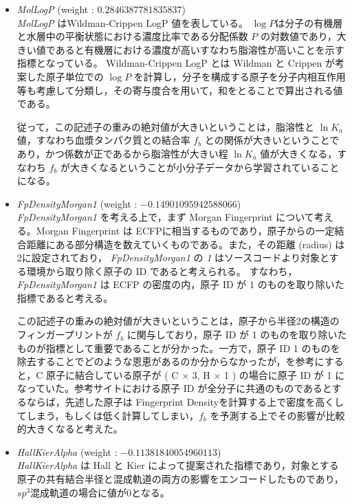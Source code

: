 \documentclass[a4j,11pt]{jarticle}
\begin{document}
\begin{itemize}
\item  \textit{MolLogP} (weight : $0.2846387781835837$) \\
 \textit{MolLogP} はWildman-Crippen LogP 値を表している。\cite{rdkit_mollogp} $\log{P}$は分子の有機層と水層中の平衡状態における濃度比率である分配係数 $P$ の対数値であり，大きい値であると有機層における濃度が高いすなわち脂溶性が高いことを示す指標となっている。\cite{logp}  Wildman-Crippen LogP とは Wildman と Crippen が考案した原子単位での $\log{P}$ を計算し，分子を構成する原子を分子内相互作用等も考慮して分類し，その寄与度合を用いて，和をとることで算出される値である。\cite{mollogp}\par
従って，この記述子の重みの絶対値が大きいということは，脂溶性と $\ln{K_a}$ 値，すなわち血漿タンパク質との結合率 $f_b$ との関係が大きいということであり，かつ係数が正であるから脂溶性が大きい程 $\ln{K_a}$ 値が大きくなる，すなわち $f_b$ が大きくなるということが小分子データから学習されていることになる。
\item  \textit{FpDensityMorgan1} (weight : $-0.14901095942588066$) \\
 \textit{FpDensityMorgan1} を考える上で，まず Morgan Fingerprint について考える。Morgan Fingerprint は ECFPに相当するものであり，原子からの一定結合距離にある部分構造を数えていくものである。\cite{fp}また，その距離 (radius) は2に設定されており， \textit{FpDensityMorgan1} の \textit{1} はソースコードより対象とする環境から取り除く原子の ID であると考えられる。\cite{fp_source1}\cite{fp_source2} すなわち， \textit{FpDensityMorgan1} は ECFP の密度の内，原子 ID が 1 のものを取り除いた指標であると考える。 \par
 この記述子の重みの絶対値が大きいということは，原子から半径2の構造のフィンガープリントが $f_b$ に関与しており，原子 ID が 1 のものを取り除いたものが指標として重要であることが分かった。一方で，原子 ID 1 のものを除去することでどのような恩恵があるのか分からなかったが，\cite{fp_ID}を参考にすると，C 原子に結合している原子が ( C $\times$ 3,  H $\times$ 1 ) の場合に原子 ID が 1 になっていた。参考サイトにおける原子 ID が全分子に共通のものであるとするならば，先述した原子は Fingerprint Densityを計算する上で密度を高くしてしまう，もしくは低く計算してしまい，$f_b$ を予測する上でその影響が比較的大きくなると考えた。
\item  \textit{HallKierAlpha} (weight : $-0.11381840054960113$) \\
 \textit{HallKierAlpha} は Hall と Kier によって提案された指標であり，対象とする原子の共有結合半径と混成軌道の両方の影響をエンコードしたものであり， $sp^3$混成軌道の場合に値が0となる。\cite{hallkier}\par

\end{itemize}
\end{document}
